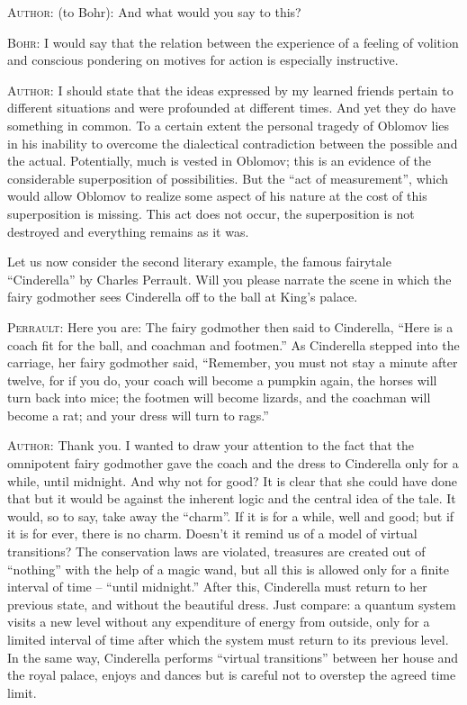 \documentclass[a4paper,sfsidenotes,colorlinks=true]{tufte-book}
\numberwithin{equation}{section}
\numberwithin{figure}{section}
\begin{document}
\textsc{Author:} (to Bohr): And what would
you say to this?  

\textsc{Bohr:} I would say that the relation between the experience
of a feeling of volition and conscious pondering on motives for action
is especially instructive.  


\textsc{Author:} I should state that the ideas expressed by my learned
friends pertain to different situations and were profounded at
different times. And yet they do have something in common. To a
certain extent the personal tragedy of Oblomov lies in his inability
to overcome the dialectical contradiction between the possible and the
actual. Potentially, much is vested in Oblomov; this is an evidence of
the considerable superposition of possibilities. But the ``act of
measurement'', which would allow Oblomov to realize some aspect of his
nature at the cost of this superposition is missing. This act does
not occur, the superposition is not destroyed and everything remains
as it was.

Let us now consider the second literary example, the famous fairytale
``Cinderella'' by Charles Perrault. Will you please narrate the scene
in which the fairy godmother sees Cinderella off to the ball at King's
palace.


\textsc{Perrault:} Here you are: The fairy godmother then said to
Cinderella, ``Here is a coach fit for the ball, and coachman and
footmen.'' As Cinderella stepped into the carriage, her fairy godmother
said, ``Remember, you must not stay a minute after twelve, for if you
do, your coach will become a pumpkin again, the horses will turn back
into mice; the footmen will become lizards, and the coachman will
become a rat; and your dress will turn to rags.''


\textsc{Author:} Thank you. I wanted to draw your attention to the
fact that the omnipotent fairy godmother gave the coach and the dress
to Cinderella only for a while, until midnight. And why not for good?
It is clear that she could have done that but it would be against the
inherent logic and the central idea of the tale. It would, so to say,
take away the ``charm''. If it is for a while, well and good; but if
it is for ever, there is no charm. Doesn't it remind us of a model of
virtual transitions? The conservation laws are violated, treasures are
created out of ``nothing'' with the help of a magic wand, but all this
is allowed only for a finite interval of time -- ``until midnight.'' After
this, Cinderella must return to her previous state, and without the
beautiful dress. Just compare: a quantum system visits a new level
without any expenditure of energy from outside, only for a limited
interval of time after which the system must return to its previous
level. In the same way, Cinderella performs ``virtual transitions''
between her house and the royal palace, enjoys and dances but is
careful not to overstep the agreed time limit. 
\end{document}
